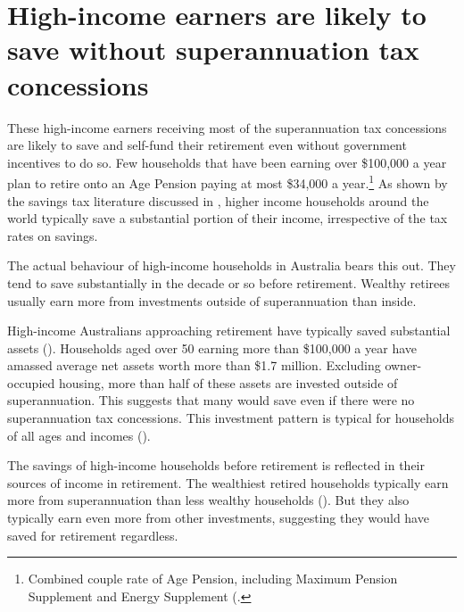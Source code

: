 \section{High-income earners are likely to save without superannuation tax concessions}\label{sec:SUPER-3-2}
These high-income earners receiving most of the superannuation tax concessions are likely to save and self-fund their retirement even without government incentives to do so. Few households that have been earning over \$100,000 a year plan to retire onto an Age Pension paying at most \$34,000 a year.\footnote{Combined couple rate of Age Pension, including Maximum Pension Supplement and Energy Supplement (\textcite{DHS2015IncomeTestForPensions}.}  As shown by the savings tax literature discussed in , higher income households around the world typically save a substantial portion of their income, irrespective of the tax rates on savings. 

The actual behaviour of high-income households in Australia bears this out. They tend to save substantially in the decade or so before retirement. Wealthy retirees usually earn more from investments outside of superannuation than inside. 



High-income Australians approaching retirement have typically saved substantial assets (). Households aged over 50 earning more than \$100,000 a year have amassed average net assets worth more than \$1.7 million. Excluding owner-occupied housing, more than half of these assets are invested outside of superannuation. This suggests that many would save even if there were no superannuation tax concessions. This investment pattern is typical for households of all ages and incomes ().

The savings of high-income households before retirement is reflected in their sources of income in retirement. The wealthiest retired households typically earn more from superannuation than less wealthy households (). But they also typically earn even more from other investments, suggesting they would have saved for retirement regardless.



